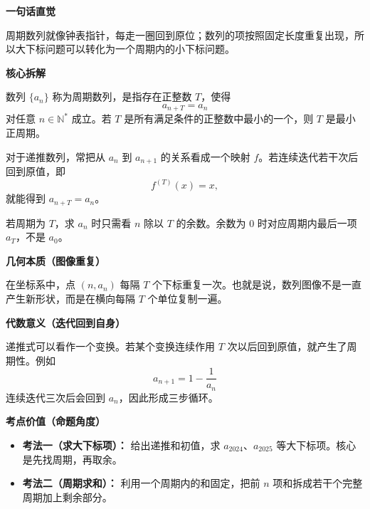 \begin{explanationbox}
	\textbf{\textcolor{CExplanation}{一句话直觉}}

	周期数列就像钟表指针，每走一圈回到原位；数列的项按照固定长度重复出现，所以大下标问题可以转化为一个周期内的小下标问题。

	\medskip
	\textbf{\textcolor{CExplanation}{核心拆解}}
	\begin{description}[style=nextline, leftmargin=2.8em, labelsep=0.5em, itemsep=0.45em]
		\item[\textbf{要点一（周期定义）：}]
		      数列 \(\{a_n\}\) 称为周期数列，是指存在正整数 \(T\)，使得
		      \[
			      a_{n+T}=a_n
		      \]
		      对任意 \(n\in\mathbb N^*\) 成立。若 \(T\) 是所有满足条件的正整数中最小的一个，则 \(T\) 是最小正周期。

		\item[\textbf{要点二（递推验证）：}]
		      对于递推数列，常把从 \(a_n\) 到 \(a_{n+1}\) 的关系看成一个映射 \(f\)。若连续迭代若干次后回到原值，即
		      \[
			      f^{(T)}(x)=x,
		      \]
		      就能得到 \(a_{n+T}=a_n\)。

		\item[\textbf{要点三（下标转换）：}]
		      若周期为 \(T\)，求 \(a_n\) 时只需看 \(n\) 除以 \(T\) 的余数。余数为 \(0\) 时对应周期内最后一项 \(a_T\)，不是 \(a_0\)。
	\end{description}

	\medskip
	\textbf{\textcolor{CExplanation}{几何本质（图像重复）}}

	在坐标系中，点 \((n,a_n)\) 每隔 \(T\) 个下标重复一次。也就是说，数列图像不是一直产生新形状，而是在横向每隔 \(T\) 个单位复制一遍。

	\medskip
	\textbf{\textcolor{CExplanation}{代数意义（迭代回到自身）}}

	递推式可以看作一个变换。若某个变换连续作用 \(T\) 次以后回到原值，就产生了周期性。例如
	\[
		a_{n+1}=1-\frac1{a_n}
	\]
	连续迭代三次后会回到 \(a_n\)，因此形成三步循环。

	\medskip
	\textbf{\textcolor{CExplanation}{考点价值（命题角度）}}
	\begin{itemize}[leftmargin=*, itemsep=0.5em, topsep=0.4em]
		\item \textbf{考法一（求大下标项）：} 给出递推和初值，求 \(a_{2024}\)、\(a_{2025}\) 等大下标项。核心是先找周期，再取余。
		\item \textbf{考法二（周期求和）：} 利用一个周期内的和固定，把前 \(n\) 项和拆成若干个完整周期加上剩余部分。
	\end{itemize}


\end{explanationbox}
